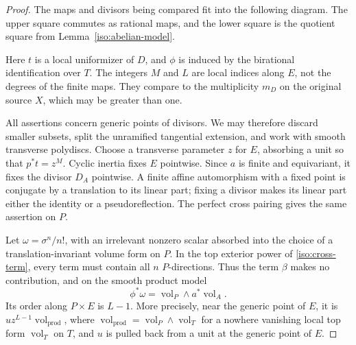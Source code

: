 \begin{proof}
The maps and divisors being compared fit into the following diagram.
The upper square commutes as rational maps, and the lower square is
the quotient square from Lemma~\ref{iso:abelian-model}.
\begin{center}
\end{center}
Here \(t\) is a local uniformizer of \(D\), and \(\phi\) is induced by
the birational identification over \(T\).  The integers \(M\) and
\(L\) are local indices along \(E\), not the degrees of the finite
maps.  They compare to the multiplicity \(m_D\) on the original
source \(X\), which may be greater than one.

All assertions concern generic points of divisors.  We may therefore
discard smaller subsets, split the unramified tangential extension,
and work with smooth transverse polydiscs.  Choose a transverse
parameter \(z\) for \(E\), absorbing a unit so that \(p^*t=z^M\).
Cyclic inertia fixes \(E\) pointwise.  Since \(a\) is finite and
equivariant, it fixes the divisor \(D_A\) pointwise.
A finite affine automorphism with a fixed point is conjugate by a
translation to its linear part; fixing a divisor makes its linear
part either the identity or a pseudoreflection.
The perfect cross pairing gives the same assertion on \(P\).

Let \(\omega=\sigma^n/n!\), with an irrelevant nonzero scalar absorbed
into the choice of a translation-invariant volume form on \(P\).
In the top exterior power of \eqref{iso:cross-term}, every term must
contain all \(n\) \(P\)-directions.  Thus the term \(\beta\) makes no
contribution, and on the smooth product model
\[
             \phi^*\omega=\operatorname{vol}_P\wedge a^*
                                      \operatorname{vol}_A.
\]
Its order along \(P\times E\) is \(L-1\).  More precisely, near the
generic point of \(E\), it is \(u z^{L-1}\operatorname{vol}_{\mathrm{prod}}\),
where
\(\operatorname{vol}_{\mathrm{prod}}
=\operatorname{vol}_P\wedge\operatorname{vol}_T\)
for a nowhere vanishing local top form \(\operatorname{vol}_T\) on \(T\),
and \(u\) is pulled back from a unit at the generic point of \(E\).


\end{proof}
